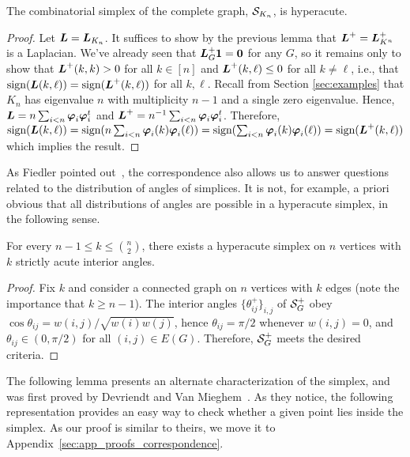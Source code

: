 \begin{corollary}
	\label{cor:Lkn+_laplacian}
	The combinatorial simplex of the complete graph,  $\mathcal{S}_{K_n}$, is hyperacute. 
\end{corollary}
\begin{proof}
	Let $\vb*{L}=\vb*{L}_{K_n}$. 
	It suffices to show by the previous lemma that $\vb*{L}^+=\vb*{L}_{K^n}^+$ is a Laplacian. We've already seen that $\vb*{L}_G^+\vb{1}=\vb{0}$ for any $G$, so it remains only to show that $\vb*{L}^+(k,k)>0$ for all $k\in[n]$ and $\vb*{L}^+(k,\ell)\leq 0$ for all $k\neq\ell$, i.e., that $\textnormal{sign}(\vb*{L}(k,\ell))=\textnormal{sign}(\vb*{L}^+(k,\ell))$ for all $k,\ell$. Recall from Section \ref{sec:examples} that $K_n$ has eigenvalue $n$ with multiplicity $n-1$ and a single zero eigenvalue. Hence, $\vb*{L}=n\sum_{i<n}\vb*{\varphi}_i\vb*{\varphi}_i^t$ and $\vb*{L}^+=n^{-1}\sum_{i<n}\vb*{\varphi}_i\vb*{\varphi}_i^t$. 
	Therefore, $\textnormal{sign}(\vb*{L}(k,\ell)) = \textnormal{sign}(n\sum_{i<n}\vb*{\varphi}_i(k)\vb*{\varphi}_i(\ell)) = \textnormal{sign}(\sum_{i<n}\vb*{\varphi}_i(k)\vb*{\varphi}_i(\ell)) = \textnormal{sign}(\vb*{L}^+(k,\ell))$ which implies the result. 
\end{proof}


As Fiedler pointed out~\cite{fiedler1993geometric}, the correspondence also allows us to answer questions related to the distribution of angles of simplices. It is not, for example, a priori obvious that all distributions of angles  are possible in a hyperacute simplex, in the following sense. 

\begin{lemma}
	For every $n-1\leq k \leq \binom{n}{2}$, there exists a hyperacute simplex on $n$ vertices with $k$ strictly acute interior angles. 
\end{lemma}
\begin{proof}
	Fix $k$ and consider a connected graph on $n$ vertices with $k$ edges (note the importance that $k\geq n-1$). The interior angles $\{\theta_{ij}^+\}_{i,j}$ of $\mathcal{S}_G^+$ obey $\cos\theta_{ij} = w(i,j) / \sqrt{w(i)w(j)}$, hence $\theta_{ij}=\pi/2$ whenever $w(i,j)=0$, and $\theta_{ij}\in(0,\pi/2)$ for all $(i,j)\in E(G)$. Therefore, $\mathcal{S}_G^+$ meets the desired criteria. 
\end{proof}



The following lemma presents an alternate characterization of the simplex, and was first proved by Devriendt  and Van Mieghem~\cite{devriendt2018simplex}. As they notice, the following representation provides an easy way to check whether a given point lies inside the simplex. As our proof is similar  to theirs, we move  it to  Appendix~\ref{sec:app_proofs_correspondence}. 

